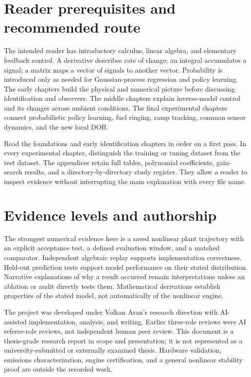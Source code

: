 \section{Reader prerequisites and recommended route}
The intended reader has introductory calculus, linear algebra, and elementary feedback control. A derivative describes rate of change; an integral accumulates a signal; a matrix maps a vector of signals to another vector. Probability is introduced only as needed for Gaussian-process regression and policy learning. The early chapters build the physical and numerical picture before discussing identification and observers. The middle chapters explain inverse-model control and its changes across ambient conditions. The final experimental chapters connect probabilistic policy learning, fuel ringing, ramp tracking, common sensor dynamics, and the new local DOB.

Read the foundations and early identification chapters in order on a first pass. In every experimental chapter, distinguish the training or tuning dataset from the test dataset. The appendices retain full tables, polynomial coefficients, gain-search results, and a directory-by-directory study register. They allow a reader to inspect evidence without interrupting the main explanation with every file name.

\section{Evidence levels and authorship}
The strongest numerical evidence here is a saved nonlinear plant trajectory with an explicit acceptance test, a defined evaluation window, and a matched comparator. Independent algebraic replay supports implementation correctness. Held-out prediction tests support model performance on their stated distribution. Narrative explanations of why a result occurred remain interpretations unless an ablation or audit directly tests them. Mathematical derivations establish properties of the stated model, not automatically of the nonlinear engine.

The project was developed under Volkan Aran's research direction with AI-assisted implementation, analysis, and writing. Earlier three-role reviews were AI referee-role reviews, not independent human peer review. This document is a thesis-grade research report in scope and presentation; it is not represented as a university-submitted or externally examined thesis. Hardware validation, emissions characterization, engine certification, and a general nonlinear stability proof are outside the recorded work.

